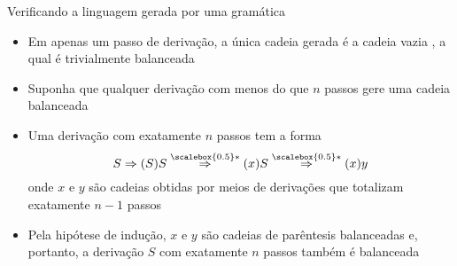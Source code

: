 \begin{frame}[fragile]{Verificando a linguagem gerada por uma gramática}

    \begin{itemize}
        \item Em apenas um passo de derivação, a única cadeia gerada é a cadeia vazia , a qual é trivialmente balanceada

        \item Suponha que qualquer derivação com menos do que $n$ passos gere uma cadeia balanceada

        \item Uma derivação com exatamente $n$ passos tem a forma
        \[
            S\Rightarrow (S)S \overset{\scalebox{0.5}*}{\Rightarrow} (x)S \overset{\scalebox{0.5}*}{\Rightarrow} (x)y
        \]
        onde $x$ e $y$ são cadeias obtidas por meios de derivações que totalizam exatamente $n - 1$ passos

        \item Pela hipótese de indução, $x$ e $y$ são cadeias de parêntesis balanceadas e, portanto, a derivação $S$ com exatamente $n$ passos também é balanceada
    \end{itemize}

\end{frame}

